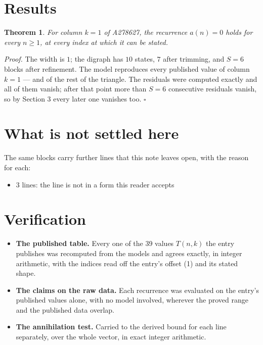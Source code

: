 \documentclass[11pt]{article}
\newtheorem{theorem}{Theorem}
\theoremstyle{definition}
\begin{document}
\section{Results}

\begin{theorem} For column $k = 1$ of A278627, the recurrence $a(n) = 0$ holds for every $n \ge 1$, at every index at which it can be stated.\end{theorem}

{\itshape Proof.} The width is $1$; the digraph has $10$ states, $7$ after trimming, and $S = 6$ blocks after refinement. The model reproduces every published value of column $k = 1$ --- and of the rest of the triangle. The residuals were computed exactly and all of them vanish; after that point more than $S = 6$ consecutive residuals vanish, so by Section 3 every later one vanishes too. $\square$

\section{What is not settled here}

The same blocks carry further lines that this note leaves open, with the reason for each:

\begin{itemize}

\item 3 lines: the line is not in a form this reader accepts

\end{itemize}

\section{Verification}

\begin{itemize}

\item {\bfseries The published table.} Every one of the 39 values $T(n,k)$ the entry publishes was recomputed from the models and agrees exactly, in integer arithmetic, with the indices read off the entry's offset (1) and its stated shape.

\item {\bfseries The claims on the raw data.} Each recurrence was evaluated on the entry's published values alone, with no model involved, wherever the proved range and the published data overlap.

\item {\bfseries The annihilation test.} Carried to the derived bound for each line separately, over the whole vector, in exact integer arithmetic.

\end{itemize}
\end{document}
